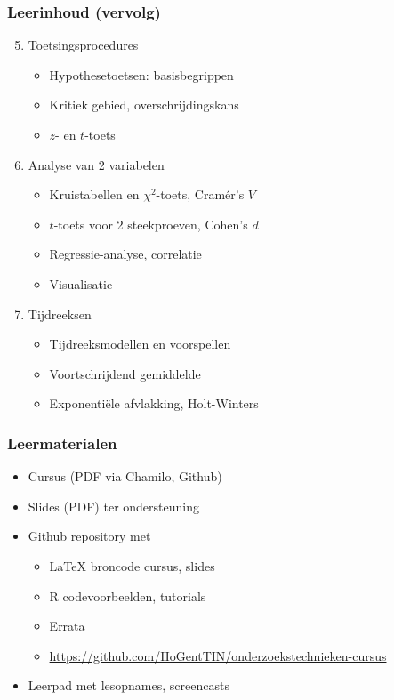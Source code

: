 \documentclass[aspectratio=169]{beamer}
\begin{document}
\begin{frame}
\frametitle{Leerinhoud (vervolg)}

  \begin{enumerate}
    \setcounter{enumi}{4}
    \item Toetsingsprocedures
    \begin{itemize}
      \item Hypothesetoetsen: basisbegrippen
      \item Kritiek gebied, overschrijdingskans
      \item $z$- en $t$-toets
    \end{itemize}
    \item Analyse van 2 variabelen
    \begin{itemize}
      \item Kruistabellen en $\chi^2$-toets, Cramér's $V$
      \item $t$-toets voor 2 steekproeven, Cohen's $d$
      \item Regressie-analyse, correlatie
      \item Visualisatie
    \end{itemize}
    \item Tijdreeksen
    \begin{itemize}
      \item Tijdreeksmodellen en voorspellen
      \item Voortschrijdend gemiddelde
      \item Exponentiële afvlakking, Holt-Winters
    \end{itemize}
  \end{enumerate}
\end{frame}

\begin{frame}
  \frametitle{Leermaterialen}

  \begin{itemize}
    \item Cursus (PDF via Chamilo, Github)
    \item Slides (PDF) ter ondersteuning
    \item Github repository met
    \begin{itemize}
      \item \LaTeX{} broncode cursus, slides
      \item R codevoorbeelden, tutorials
      \item Errata
      \item \url{https://github.com/HoGentTIN/onderzoekstechnieken-cursus}
    \end{itemize}
    \item Leerpad met lesopnames, screencasts
  \end{itemize}    

\end{frame}
\end{document}

